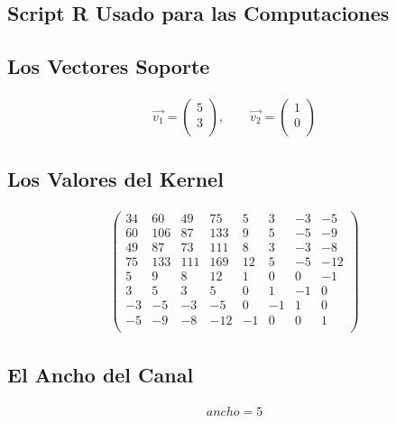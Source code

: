 \documentclass[fleqn]{llncs}
\begin{document}
\subsection{Script R Usado para las Computaciones}


\newpage

\subsection{Los Vectores Soporte}
\begin{align*}
	\overrightarrow{v_1} =
	\begin{pmatrix}
		5 \\
		3 \\
	\end{pmatrix},
	\qquad
	\overrightarrow{v_2} =
	\begin{pmatrix}
		1 \\
		0 \\
	\end{pmatrix}
\end{align*}

\subsection{Los Valores del Kernel}
\begin{align*}
	\begin{pmatrix}
		34 & 60 & 49 & 75 &  5 &  3 & -3 & -5 \\
		60 & 106 & 87 & 133 &  9 &  5 & -5 & -9 \\
		49 & 87 & 73 & 111 &  8 &  3 & -3 & -8 \\
		75 & 133 & 111 & 169 & 12 &  5 & -5 & -12 \\
		5 & 9 & 8 & 12 &  1 &  0 &  0 & -1 \\
		3 & 5 & 3 & 5 &  0 &  1 & -1 &  0 \\
		-3 & -5 & -3 & -5 &  0 & -1 &  1 &  0 \\
		-5 & -9 & -8 & -12 & -1 &  0 &  0 &  1 \\
	\end{pmatrix}
\end{align*}

\subsection{El Ancho del Canal}
\begin{align*}
	ancho = 5
\end{align*}
\end{document}
